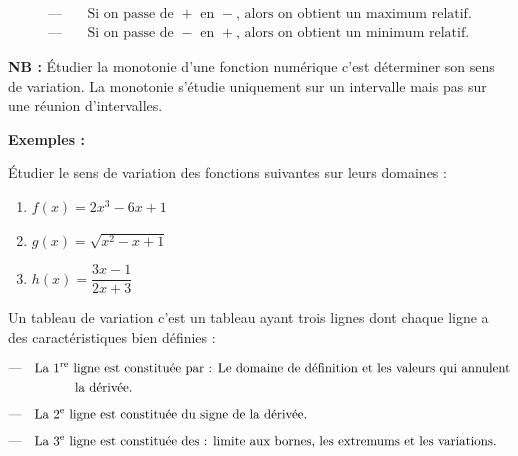\documentclass[12pt,a4paper]{article}
\begin{document}
\begin{tcolorbox}[
    colback=green!5,
    colframe=green!60!black,
    colbacktitle=green!60!black,
    title=\textbf{Remarque :},
    fonttitle=\bfseries,
    boxrule=0.8pt
]

\[
\begin{aligned}
\text{---}\quad &\text{Si on passe de $+$ en $-$, alors on obtient un maximum relatif.}
\\[2mm]
\text{---}\quad &\text{Si on passe de $-$ en $+$, alors on obtient un minimum relatif.}
\end{aligned}
\]

\textbf{NB :} Étudier la monotonie d'une fonction numérique c'est
déterminer son sens de variation. La monotonie s'étudie uniquement
sur un intervalle mais pas sur une réunion d'intervalles.

\end{tcolorbox}



\textbf{Exemples :}

Étudier le sens de variation des fonctions suivantes sur leurs domaines :

\begin{enumerate}
    \item $f(x)=2x^3-6x+1$
    
    \item $g(x)=\sqrt{x^2-x+1}$
    
    \item $h(x)=\dfrac{3x-1}{2x+3}$
\end{enumerate}


\begin{tcolorbox}[
    colback=green!5,
    colframe=green!60!black,
    colbacktitle=green!60!black,
    title=\textbf{2 - Tableau de variation},
    fonttitle=\bfseries,
    boxrule=0.8pt
]

Un tableau de variation c'est un tableau ayant trois lignes dont chaque ligne a des caractéristiques bien définies :

\[
\begin{aligned}
\text{---}\quad &\text{La 1\textsuperscript{re} ligne est constituée par :
Le domaine de définition et les valeurs qui annulent}\\
&\hspace{1.1cm}\text{la dérivée.}
\\[2mm]
\text{---}\quad &\text{La 2\textsuperscript{e} ligne est constituée du signe de la dérivée.}
\\[2mm]
\text{---}\quad &\text{La 3\textsuperscript{e} ligne est constituée des :
limite aux bornes, les extremums et les variations.}
\end{aligned}
\]
\end{tcolorbox}
\end{document}
